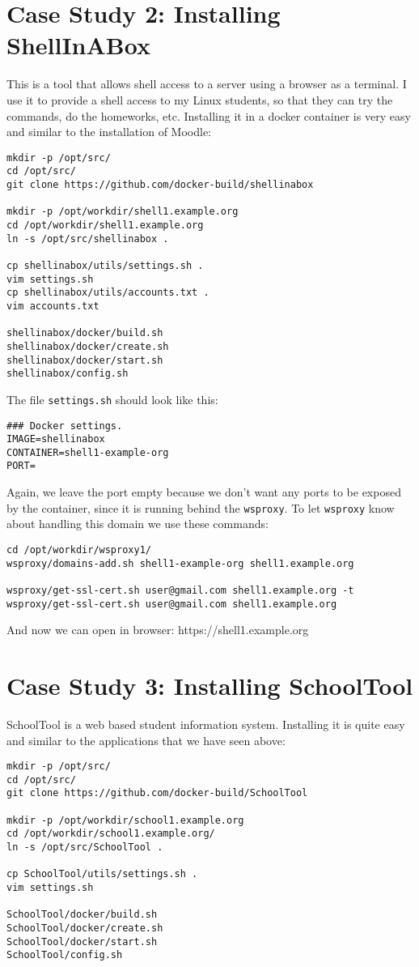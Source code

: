 \documentclass[a4paper]{article}
\begin{document}
\section{Case Study 2: Installing ShellInABox}

This is a tool that allows shell access to a server using a browser as
a terminal.  I use it to provide a shell access to my Linux students,
so that they can try the commands, do the homeworks, etc. Installing
it in a docker container is very easy and similar to the installation
of Moodle:
\begin{verbatim}
mkdir -p /opt/src/
cd /opt/src/
git clone https://github.com/docker-build/shellinabox

mkdir -p /opt/workdir/shell1.example.org
cd /opt/workdir/shell1.example.org
ln -s /opt/src/shellinabox .

cp shellinabox/utils/settings.sh .
vim settings.sh
cp shellinabox/utils/accounts.txt .
vim accounts.txt

shellinabox/docker/build.sh
shellinabox/docker/create.sh
shellinabox/docker/start.sh
shellinabox/config.sh
\end{verbatim}

The file \verb~settings.sh~ should look like this:
\begin{verbatim}
### Docker settings.
IMAGE=shellinabox
CONTAINER=shell1-example-org
PORT=
\end{verbatim}

Again, we leave the port empty because we don't want any ports to be
exposed by the container, since it is running behind the
\verb/wsproxy/.  To let \verb/wsproxy/ know about handling this domain
we use these commands:
\begin{verbatim}
cd /opt/workdir/wsproxy1/
wsproxy/domains-add.sh shell1-example-org shell1.example.org

wsproxy/get-ssl-cert.sh user@gmail.com shell1.example.org -t
wsproxy/get-ssl-cert.sh user@gmail.com shell1.example.org
\end{verbatim}

And now we can open in browser: https://shell1.example.org


\section{Case Study 3: Installing SchoolTool}

SchoolTool is a web based student information system. Installing it is
quite easy and similar to the applications that we have seen above:
\begin{verbatim}
mkdir -p /opt/src/
cd /opt/src/
git clone https://github.com/docker-build/SchoolTool

mkdir -p /opt/workdir/school1.example.org
cd /opt/workdir/school1.example.org/
ln -s /opt/src/SchoolTool .

cp SchoolTool/utils/settings.sh .
vim settings.sh

SchoolTool/docker/build.sh
SchoolTool/docker/create.sh
SchoolTool/docker/start.sh
SchoolTool/config.sh
\end{verbatim}
\end{document}
